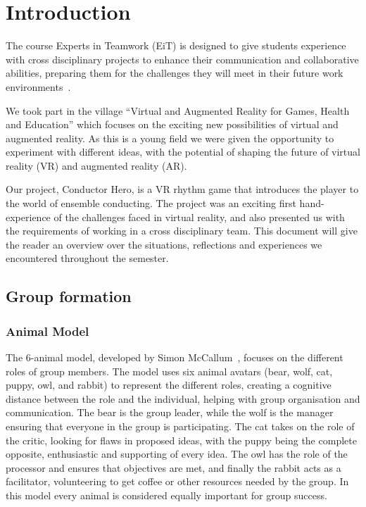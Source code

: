 \chapter{Introduction}
The course Experts in Teamwork (EiT) is designed to give students experience with cross disciplinary projects to enhance their communication and collaborative abilities, preparing them for the challenges they will meet in their future work environments~\cite{ntnu_what_is_eit}. 

We took part in the village “Virtual and Augmented Reality for Games, Health and Education” which focuses on the exciting new possibilities of virtual and augmented reality. As this is a young field we were given the opportunity to experiment with different ideas, with the potential of shaping the future of virtual reality (VR) and augmented reality (AR). 

Our project, Conductor Hero, is a VR rhythm game that introduces the player to the world of ensemble conducting. The project was an exciting first hand-experience of the challenges faced in virtual reality, and also presented us with the requirements of working in a cross disciplinary team. This document will give the reader an overview over the situations, reflections and experiences we encountered throughout the semester.


\section{Group formation}
\subsection{Animal Model}
The 6-animal model, developed by Simon McCallum~\cite{six_animal_model}, focuses on the different roles of group members. The model uses six animal avatars (bear, wolf, cat, puppy, owl, and rabbit) to represent the different roles, creating a cognitive distance between the role and the individual, helping with group organisation and communication. The bear is the group leader, while the wolf is the manager ensuring that everyone in the group is participating. The cat takes on the role of the critic, looking for flaws in proposed ideas, with the puppy being the complete opposite, enthusiastic and supporting of every idea. The owl has the role of the processor and ensures that objectives are met, and finally the rabbit acts as a facilitator, volunteering to get coffee or other resources needed by the group. In this model every animal is considered equally important for group success.

